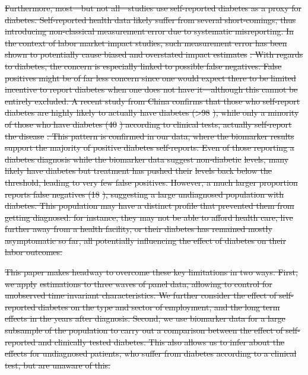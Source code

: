 \documentclass[12pt,english]{article}
\providecommand{\DIFdeltex}[1]{{\protect\color{red}\sout{#1}}}                      %
\providecommand{\DIFdel}[1]{\texorpdfstring{\DIFdeltex{#1}}{}} %
\begin{document}
\DIFdel{Furthermore, most---but not all---studies use self-reported diabetes as a proxy for diabetes. Self-reported health data likely suffer from  several short-comings, thus introducing non-classical measurement error due to systematic misreporting. In the context of labor market impact studies, such measurement error has been shown to potentially cause biased and overstated impact estimates }%
\DIFdel{.  With regards to diabetes, the concern is especially linked to possible false negatives. False positives might be of far less concern since one would expect there to be limited incentive to report diabetes when one does not have it---although this cannot be entirely excluded.  A recent study from China confirms that those who self-report diabetes are highly likely to actually have diabetes (>98}%
\DIFdel{), while only a minority of those who have diabetes (40}%
\DIFdel{) according to clinical tests, actually self-report the disease }%
\DIFdel{. This pattern is confirmed in our data, where the biomarker results support the majority of positive diabetes self-reports. Even of those reporting a diabetes diagnosis while the biomarker data suggest non-diabetic }%
\DIFdel{levels, many likely have diabetes but treatment has pushed their }%
\DIFdel{levels back below the threshold, leading to very few false positives.  However, a much larger proportion reports false negatives (18}%
\DIFdel{), suggesting a large undiagnosed population with diabetes. This population may have a distinct profile that prevented them from getting diagnosed: for instance, they may not be able to afford health care, live further away from a health facility,  or their diabetes has remained mostly asymptomatic so far, all potentially influencing the effect of diabetes on their labor outcomes.
}%

\DIFdel{This paper makes headway to overcome these key limitations in two ways.  First, we apply }%
\DIFdel{estimations to three waves of panel data, allowing to control for unobserved time invariant characteristics. We further consider the effect of self-reported diabetes on the type and sector of employment, and the long term effects in the years after diagnosis.  Second, we use biomarker data for a large subsample of the population to carry out a comparison between the effect of self-reported and clinically tested diabetes. This also allows us to infer about the effects for undiagnosed patients, who suffer from diabetes according to a clinical test, but are unaware of this.
}%
\end{document}
